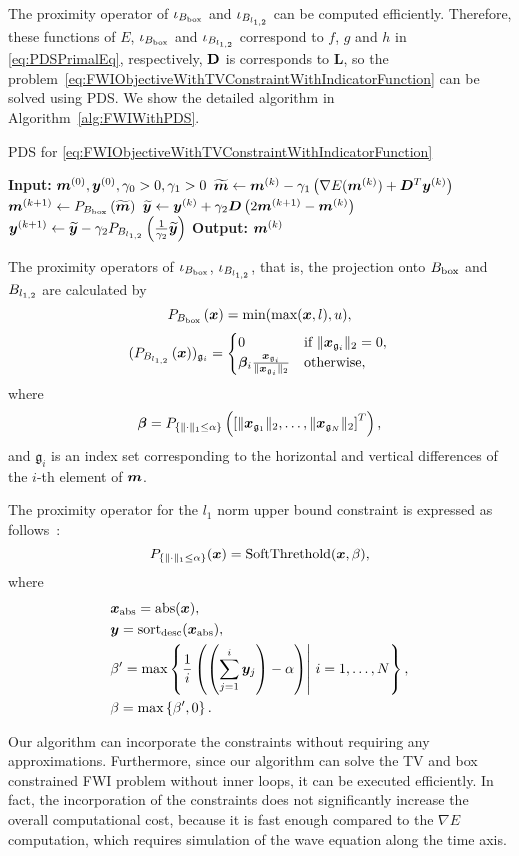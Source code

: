The proximity operator of $\iota_{B_{\mathrm{box}}}$ and $\iota_{B_{l_{1,2}}}$ can be computed efficiently.
Therefore, these functions of $E$, $\iota_{B_{\mathrm{box}}}$ and $\iota_{B_{l_{1,2}}}$ correspond to $f$, $g$ and $h$ in \eqref{eq:PDSPrimalEq}, respectively, $\mathbf{D}$ is corresponds to $\bm{L}$, so the problem~\eqref{eq:FWIObjectiveWithTVConstraintWithIndicatorFunction} can be solved using PDS.
We show the detailed algorithm in Algorithm~\ref{alg:FWIWithPDS}.
\begin{algorithm}[t]
    \caption{PDS for \eqref{eq:FWIObjectiveWithTVConstraintWithIndicatorFunction}}\label{alg:FWIWithPDS}
    \begin{algorithmic}[1]
        \Statex \textbf{Input:} $ \bm{m}^{(0)}, \bm{y}^{(0)}, \gamma_0 > 0, \gamma_1 > 0 $
            \State $\widetilde{\bm{m}} \leftarrow \bm{m}^{(k)} - \gamma_1 \left( \nabla E(\bm{m}^{(k)}) + \bm{D}^T \bm{y}^{(k)} \right) $
            \State $\bm{m}^{(k+1)}     \leftarrow P_{B_{\mathrm{box}}} \left( \widetilde{\bm{m}} \right) $
            \State $\widetilde{\bm{y}}     \leftarrow \bm{y}^{(k)} + \gamma_2 \bm{D} \left( 2\bm{m}^{(k+1)} - \bm{m}^{(k)} \right) $
            \State $\bm{y}^{(k+1)}         \leftarrow \widetilde{\bm{y}} - \gamma_2 P_{B_{l_{1,2}}}\left(\frac 1 {\gamma_2} {\widetilde{\bm y}}\right) $
        \EndWhile
        \Statex \textbf{Output:} $\bm{m}^{(k)}$
    \end{algorithmic}
\end{algorithm}


The proximity operators of $\iota_{B_{\mathrm{box}}}$, $\iota_{B_{l_{1,2}}}$, that is, the projection onto $B_{\mathrm{box}}$ and ${B_{l_{1,2}}}$ are calculated by
\begin{equation} \label{eq:ProximityOperatorForBoxConstraint} \projBoxSolution, \end{equation}
\begin{equation} \label{eq:ProximityOperatorForL12Ball} \projLOneTwoBallSolution \end{equation}
where
\begin{equation} \label{eq:ProximityOperatorForL12BallWhere} \projLOneTwoBallSolutionWhere, \end{equation}
and $\mathfrak{g}_i$ is an index set corresponding to the horizontal and vertical differences of the $i$-th element of $\bm{m}$.

The proximity operator for the $l_1$ norm upper bound constraint is expressed as follows~\cite{L1-ball-projection}:
\begin{equation} \label{eq:ProximityOperatorForL1Ball}  \projLOneBallSolution, \end{equation}
where
\begin{equation} \label{eq:ProximityOperatorForL1BallWhere} \projLOneBallSolutionWhere \end{equation}

Our algorithm can incorporate the constraints without requiring any approximations.
Furthermore, since our algorithm can solve the TV and box constrained FWI problem without inner loops, it can be executed efficiently.
In fact, the incorporation of the constraints does not significantly increase the overall computational cost, because it is fast enough compared to the $\nabla E$ computation, which requires simulation of the wave equation along the time axis.
